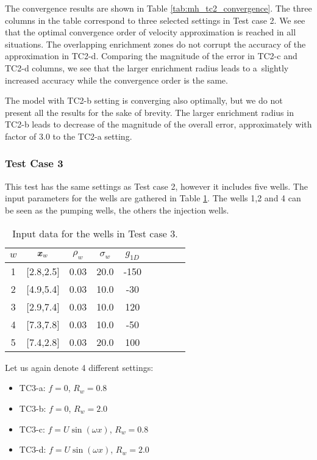 The convergence results are shown in Table \ref{tab:mh_tc2_convergence}.
The three columns in the table correspond to three selected settings in Test case 2.
We see that the optimal convergence order of velocity approximation is reached in all situations.
The overlapping enrichment zones do not corrupt the accuracy of the approximation in TC2-d.
Comparing the magnitude of the error in TC2-c and TC2-d columns, we see that the larger enrichment radius leads
to a~slightly increased accuracy while the convergence order is the same.

The model with TC2-b setting is converging also optimally, but we do not present all the results for the sake of brevity.
The larger enrichment radius in TC2-b leads to decrease of the magnitude of the overall error,
approximately with factor of 3.0 to the TC2-a setting.



\subsubsection{Test Case 3}
This test has the same settings as Test case 2, however it includes five wells.
The input parameters for the wells are gathered in Table \ref{tab:tc3_data}.
The wells 1,2 and 4 can be seen as the pumping wells, the others the injection wells.
%
\begin{table}[!hb]
\begin{center}
\begin{tabular}{ccccccccc}
\toprule
$w$ & $\mathbf{\boldsymbol{x}}_w$  & $\rho_w$ & $\sigma_w$ & $g_{1D}$\\
\midrule
1& [2.8,2.5] & 0.03 & 20.0 & -150 \\
2& [4.9,5.4] & 0.03 & 10.0 & -30 \\
3& [2.9,7.4] & 0.03 & 10.0 & 120 \\
4& [7.3,7.8] & 0.03 & 10.0 & -50 \\
5& [7.4,2.8] & 0.03 & 20.0 & 100 \\
\bottomrule
\end{tabular}
\caption{Input data for the wells in Test case 3.}
\label{tab:tc3_data}
\end{center}
\end{table}

Let us again denote 4 different settings:
\begin{itemize}
    \item TC3-a: $f=0$, $R_w=0.8$
    \item TC3-b: $f=0$, $R_w=2.0$
    \item TC3-c: $f=U\sin(\omega x)$, $R_w=0.8$
    \item TC3-d: $f=U\sin(\omega x)$, $R_w=2.0$
\end{itemize}

